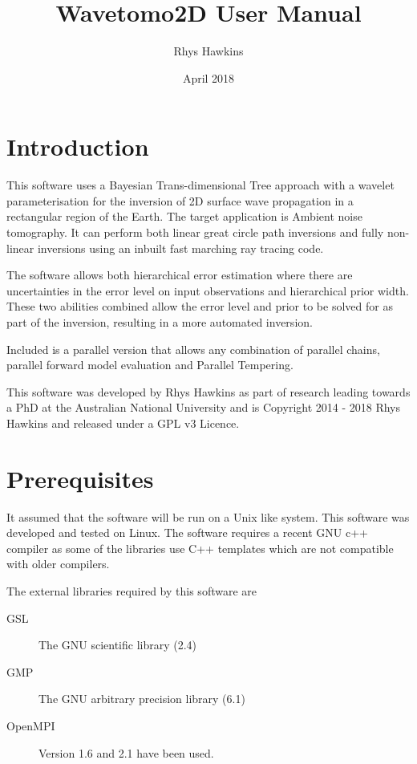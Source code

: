 \documentclass[a4paper,12pt]{article}
\begin{document}
\title{Wavetomo2D User Manual}
\author{Rhys Hawkins}
\date{April 2018}

\maketitle

\tableofcontents

\section{Introduction}

This software uses a Bayesian Trans-dimensional Tree\citep{Hawkins:2015:A} approach with a
wavelet parameterisation for the inversion of 2D surface wave
propagation in a rectangular region of the Earth. The target
application is Ambient noise tomography. It can perform both linear
great circle path inversions and fully non-linear inversions using an
inbuilt fast marching ray tracing code.

The software allows both hierarchical error estimation where there are
uncertainties in the error level on input observations and
hierarchical prior width. These two abilities combined allow the error
level and prior to be solved for as part of the inversion, resulting
in a more automated inversion.

Included is a parallel version that allows any combination of parallel
chains, parallel forward model evaluation and Parallel
Tempering\citep{Sambridge:2014:A}.

This software was developed by Rhys Hawkins as part of research leading
towards a PhD\citep{Hawkins:2018:A} at the Australian National University
and is Copyright 2014 - 2018 Rhys Hawkins and released under a GPL v3 Licence.

\section{Prerequisites}

It assumed that the software will be run on a Unix like system. This
software was developed and tested on Linux. The software requires a
recent GNU c++ compiler as some of the libraries use C++ templates
which are not compatible with older compilers.

The external libraries required by this software are

\begin{description}
\item[GSL] The GNU scientific library (2.4)
\item[GMP] The GNU arbitrary precision library (6.1)
\item[OpenMPI] Version 1.6 and 2.1 have been used.
\end{description}
\end{document}
